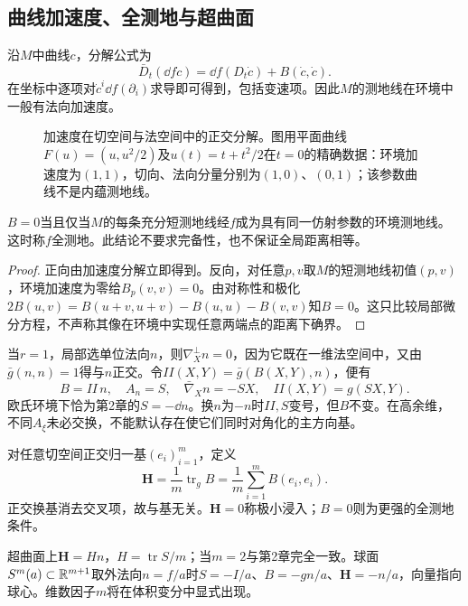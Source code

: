 \subsection*{曲线加速度、全测地与超曲面}
沿$M$中曲线$c$，分解公式为
\[
 \bar D_t(\dd f\dot c)=\dd f(D_t\dot c)+B(\dot c,\dot c).
\]
在坐标中逐项对$\dot c^i\dd f(\partial_i)$求导即可得到，包括变速项。因此$M$的测地线在环境中一般有法向加速度。
\begin{figure}[htbp]
\centering
\caption{加速度在切空间与法空间中的正交分解。图用平面曲线$F(u)=(u,u^2/2)$及$u(t)=t+t^2/2$在$t=0$的精确数据：环境加速度为$(1,1)$，切向、法向分量分别为$(1,0)$、$(0,1)$；该参数曲线不是内蕴测地线。}
\label{fig:submanifold-acceleration}
\end{figure}

\begin{proposition}[全测地的局部判据]\label{prop:totally-geodesic}
$B=0$当且仅当$M$的每条充分短测地线经$f$成为具有同一仿射参数的环境测地线。这时称$f$全测地。此结论不要求完备性，也不保证全局距离相等。
\end{proposition}
\begin{proof}
正向由加速度分解立即得到。反向，对任意$p,v$取$M$的短测地线初值$(p,v)$，环境加速度为零给$B_p(v,v)=0$。由对称性和极化
$2B(u,v)=B(u+v,u+v)-B(u,u)-B(v,v)$知$B=0$。这只比较局部微分方程，不声称其像在环境中实现任意两端点的距离下确界。
\end{proof}

当$r=1$，局部选单位法向$n$，则$\nabla^\perp_Xn=0$，因为它既在一维法空间中，又由$\bar g(n,n)=1$得与$n$正交。令$II(X,Y)=\bar g(B(X,Y),n)$，便有
\[
 B=II\,n,\quad A_n=S,\quad \bar\nabla_Xn=-SX,
 \quad II(X,Y)=g(SX,Y).
\]
欧氏环境下恰为第2章的$S=-\dd n$。换$n$为$-n$时$II,S$变号，但$B$不变。在高余维，不同$A_\xi$未必交换，不能默认存在使它们同时对角化的主方向基。

\begin{definition}[平均曲率向量]\label{def:mean-curvature-vector}
对任意切空间正交归一基$(e_i)_{i=1}^m$，定义
\[
 \mathbf H=\frac1m\operatorname{tr}_g B
 =\frac1m\sum_{i=1}^m B(e_i,e_i).
\]
正交换基消去交叉项，故与基无关。$\mathbf H=0$称极小浸入；$B=0$则为更强的全测地条件。
\end{definition}
超曲面上$\mathbf H=Hn$，$H=\operatorname{tr}S/m$；当$m=2$与第2章完全一致。球面$S^m(a)\subset\mathbb{R}^{m+1}$取外法向$n=f/a$时$S=-I/a$、$B=-gn/a$、$\mathbf H=-n/a$，向量指向球心。维数因子$m$将在体积变分中显式出现。
